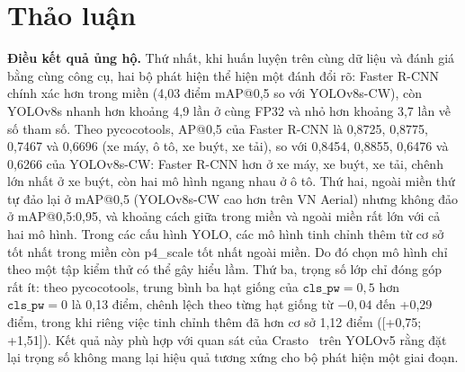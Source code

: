 \documentclass[10pt,journal,a4paper]{IEEEtran}
\newcommand{\clspw}{\texttt{cls\_pw}}
\begin{document}
\section{Thảo luận}
\textbf{Điều kết quả ủng hộ.} Thứ nhất, khi huấn luyện trên cùng dữ liệu và đánh giá bằng cùng công cụ, hai bộ phát hiện thể hiện một đánh đổi rõ: Faster R-CNN chính xác hơn trong miền (4,03 điểm mAP@0,5 so với YOLOv8s-CW), còn YOLOv8s nhanh hơn khoảng 4,9 lần ở cùng FP32 và nhỏ hơn khoảng 3,7 lần về số tham số. Theo pycocotools, AP@0,5 của Faster R-CNN là 0,8725, 0,8775, 0,7467 và 0,6696 (xe máy, ô tô, xe buýt, xe tải), so với 0,8454, 0,8855, 0,6476 và 0,6266 của YOLOv8s-CW: Faster R-CNN hơn ở xe máy, xe buýt, xe tải, chênh lớn nhất ở xe buýt, còn hai mô hình ngang nhau ở ô tô. Thứ hai, ngoài miền thứ tự đảo lại ở mAP@0,5 (YOLOv8s-CW cao hơn trên VN Aerial) nhưng không đảo ở mAP@0,5:0,95, và khoảng cách giữa trong miền và ngoài miền rất lớn với cả hai mô hình. Trong các cấu hình YOLO, các mô hình tinh chỉnh thêm từ cơ sở tốt nhất trong miền còn p4\_scale tốt nhất ngoài miền. Do đó chọn mô hình chỉ theo một tập kiểm thử có thể gây hiểu lầm. Thứ ba, trọng số lớp chỉ đóng góp rất ít: theo pycocotools, trung bình ba hạt giống của $\clspw = 0{,}5$ hơn $\clspw = 0$ là 0,13 điểm, chênh lệch theo từng hạt giống từ $-0{,}04$ đến +0,29 điểm, trong khi riêng việc tinh chỉnh thêm đã hơn cơ sở 1,12 điểm ([+0,75; +1,51]). Kết quả này phù hợp với quan sát của Crasto~\cite{crasto} trên YOLOv5 rằng đặt lại trọng số không mang lại hiệu quả tương xứng cho bộ phát hiện một giai đoạn.
\end{document}
